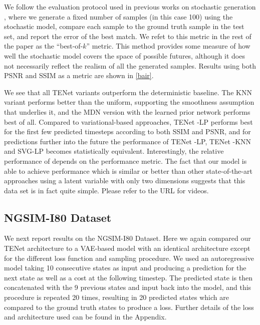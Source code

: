 \documentclass{article}
\newcommand{\modelname}{TENet }
\begin{document}
We follow the evaluation protocol used in previous works on stochastic generation \citep{Walker2016, Babaeizadeh2018, Denton2018}, where we generate a fixed number of samples (in this case 100) using the stochastic model, compare each sample to the ground truth sample in the test set, and report the error of the best match.
We refet to this metric in the rest of the paper as the ``best-of-$k$'' metric.
This method provides some measure of how well the stochastic model covers the space of possible futures, although it does not necessarily reflect the realism of all the generated samples.
Results using both PSNR and SSIM \citep{SSIM} as a metric are shown in \cref{bair}.

We see that all \modelname variants outperform the deterministic baseline.
The KNN variant performs better than the uniform, supporting the smoothness assumption that underlies it, and the MDN version with the learned prior network performs best of all.
Compared to variational-based approaches, \modelname-LP performs best for the first few predicted timesteps according to both SSIM and PSNR, and for predictions further into the future the performance of \modelname-LP, \modelname-KNN and SVG-LP becomes statistically equivalent.
 Interestingly, the relative performance of \citep{Babaeizadeh2018} depends on the performance metric.
The fact that our model is able to achieve performance which is similar or better than other state-of-the-art approaches using a latent variable with only two dimensions suggests that this data set is in fact quite simple.
Please refer to the URL for videos.


\subsection{NGSIM-I80 Dataset}

We next report results on the NGSIM-I80 Dataset.
Here we again compared our \modelname architecture to a VAE-based model with an identical architecture except for the different loss function and sampling procedure.
We used an autoregressive model taking 10 consecutive states as input and producing a prediction for the next state as well as a cost at the following timestep.
The predicted state is then concatenated with the 9 previous states and input back into the model, and this procedure is repeated 20 times, resulting in 20 predicted states which are compared to the ground truth states to produce a loss.
Further details of the loss and architecture used can be found in the Appendix.
\end{document}
